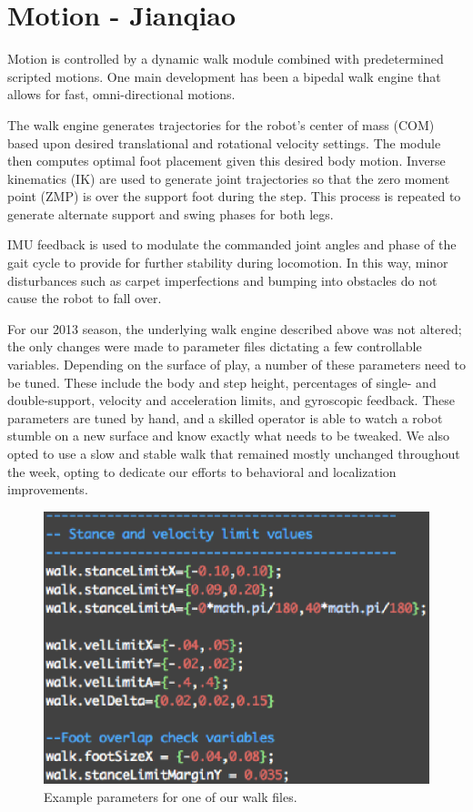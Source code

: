 \documentclass{article}
\begin{document}
\section{Motion - Jianqiao}
	Motion is controlled by a dynamic walk module combined with predetermined scripted motions. One main development has been a bipedal walk engine that allows for fast, omni-directional motions.

	The walk engine generates trajectories for the robot's center of mass (COM) based upon desired translational and rotational velocity settings. The module then computes optimal foot placement given this desired body motion. Inverse kinematics (IK) are used to generate joint trajectories so that the zero moment point (ZMP) is over the support foot during the step. This process is repeated to generate alternate support and swing phases for both legs.

	IMU feedback is used to modulate the commanded joint angles and phase of the gait cycle to provide for further stability during locomotion. In this way, minor disturbances such as carpet imperfections and bumping into obstacles do not cause the robot to fall over.

	For our 2013 season, the underlying walk engine described above was not altered; the only changes were made to parameter files dictating a few controllable variables. Depending on the surface of play, a number of these parameters need to be tuned. These include the body and step height, percentages of single- and double-support, velocity and acceleration limits, and gyroscopic feedback. These parameters are tuned by hand, and a skilled operator is able to watch a robot stumble on a new surface and know exactly what needs to be tweaked. We also opted to use a slow and stable walk that remained mostly unchanged throughout the week, opting to dedicate our efforts to behavioral and localization improvements.

	\begin{figure}[H]
		\centering
		\includegraphics[width=.60\textwidth]{figures/WalkFile.eps}
		\caption{Example parameters for one of our walk files.}
	\end{figure}
\end{document}
